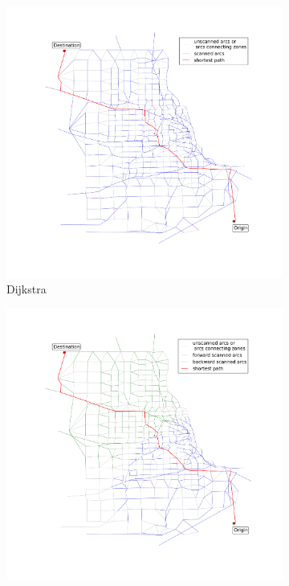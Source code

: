 \begin{figure}
    \centering
    \begin{subfigure}{.5\textwidth}
        \centering
        \includegraphics[width=\textwidth,trim=120px 120px 48px 120px,clip]{img/chicago_dijkstra}
        \caption{Dijkstra}
        \label{fig:chicago_dijkstra}
    \end{subfigure}%
    \begin{subfigure}{.5\textwidth}
        \centering
        \includegraphics[width=\textwidth,trim=120px 120px 48px 120px,clip]{img/chicago_bidirect}

\end{subfigure}
\end{figure}
